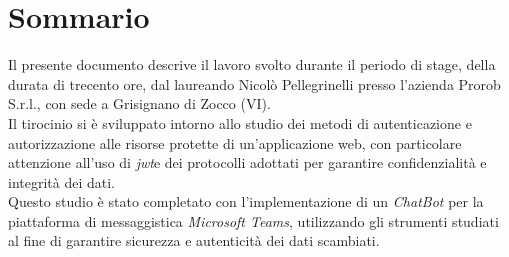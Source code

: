 \cleardoublepage
{}
{}
\begingroup
\let\clearpage\relax
\let\cleardoublepage\relax
\let\cleardoublepage\relax

\chapter*{Sommario}

Il presente documento descrive il lavoro svolto durante il periodo di stage, della durata di trecento ore, dal laureando Nicolò Pellegrinelli presso l'azienda Prorob S.r.l., con sede a Grisignano di Zocco (VI).\\
Il tirocinio si è sviluppato intorno allo studio dei metodi di autenticazione e autorizzazione alle risorse protette di un'applicazione web, con particolare attenzione all'uso di \emph{\gls{jwt}}\glsfirstoccur e dei protocolli adottati per garantire confidenzialità e integrità dei dati.\\
Questo studio è stato completato con l'implementazione di un \emph{ChatBot} per la piattaforma di messaggistica \emph{Microsoft Teams}, utilizzando gli strumenti studiati al fine di garantire sicurezza e autenticità dei dati scambiati.\\




\endgroup

\vfill
